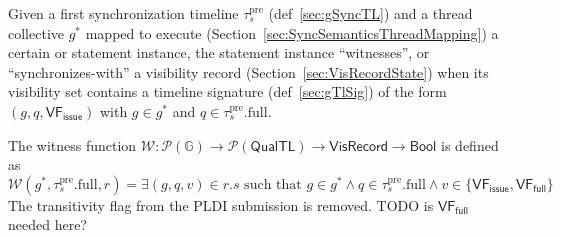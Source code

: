 

Given a first synchronization timeline $\tau_s^\mathrm{pre}$ (def~\ref{sec:gSyncTL}) and a thread collective $g^*$ mapped to execute (Section~\ref{sec:SyncSemanticsThreadMapping}) a certain  or  statement instance, the statement instance ``witnesses'', or ``synchronizes-with'' a visibility record (Section~\ref{sec:VisRecordState}) when its visibility set contains a timeline signature (def~\ref{sec:gTlSig}) of the form $(g, q, \mathsf{VF_{issue}})$ with $g \in g^*$ and $q \in \tau_s^\mathrm{pre}.\mathrm{full}$.

The witness function $\mathcal{W}: \mathcal{P}(\mathbb{G}) \to \mathcal{P}(\mathsf{QualTL}) \to \mathsf{VisRecord} \to \mathsf{Bool}$ is defined as
\begin{equation*}
  \mathcal{W}(g^*, \tau_s^\mathrm{pre}.\mathrm{full}, r) = \exists (g, q, v) \in r.s \text{ such that } g \in g^* \land q \in \tau_s^\mathrm{pre}.\mathrm{full} \land v \in \{ \mathsf{VF_{issue}}, \mathsf{VF_{full}} \}
\end{equation*}
The transitivity flag from the PLDI submission is removed. TODO is $\mathsf{VF_{full}}$ needed here?

